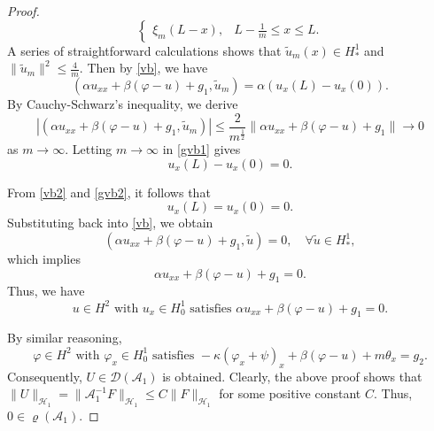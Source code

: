 \documentclass[10pt,a4paper]{amsart}
\begin{document}
\begin{proof}
\[\begin{cases}
		\xi_m(L-x), & L-\frac{1}{m}\le x\le L.
	\end{cases}
	\]
	A series of straightforward calculations shows that $\tilde{u}_m(x)\in H_*^1$ and $\|\tilde{u}_m\|^2 \le\frac{4}{m}$. Then by \eqref{vb}, we have
	\begin{equation}\label{gvb1}
		(\alpha u_{xx}+\beta(\varphi - u) + g_1,\tilde{u}_m)=\alpha \left(u_x(L)-u_x(0)\right).
	\end{equation}
	By Cauchy-Schwarz's inequality, we derive
	\[
	\left| (\alpha u_{xx}+\beta(\varphi - u) + g_1,\tilde{u}_m)\right|\le\frac{2}{m^{\frac{1}{2}}}\|\alpha u_{xx}+\beta(\varphi - u) + g_1\|\to0
	\]
	as $m\to\infty$.
    Letting $m\to\infty$ in \eqref{gvb1} gives
	\begin{equation}\label{gvb2}
		u_x(L)-u_x(0)=0.
	\end{equation}
	
	From \eqref{vb2} and \eqref{gvb2}, it follows that
	\[
	u_x(L)=u_x(0)=0.
	\]
	Substituting back into \eqref{vb}, we obtain
	\[
	(\alpha u_{xx}+\beta(\varphi - u) + g_1,\tilde{u})=0, \quad \forall \tilde{u}\in H_*^1,
	\]
	which implies
	\[
	\alpha u_{xx}+\beta(\varphi - u) + g_1=0.
	\]
	Thus, we have
	\begin{equation}\label{jl6}
		u\in H^2\text{ with } u_x\in H_0^1 \text{ satisfies } \alpha u_{xx}+\beta(\varphi - u) + g_1=0.
	\end{equation}
	
	By similar reasoning,
	\begin{equation}\label{jl7}
		\varphi\in H^2\text{ with } \varphi_x\in H_0^1\text{ satisfies } -\kappa(\varphi_x + \psi)_x + \beta(\varphi - u) + m\theta_x = g_2.
	\end{equation}
	Consequently, $U \in \mathcal{D}(\mathcal{A}_1)$ is obtained. Clearly, the above proof shows that $\|U\|_{\mathcal{H}_1}=\|\mathcal{A}_1^{-1}F\|_{\mathcal{H}_1} \leq C\|F\|_{\mathcal{H}_1}$ for some positive constant $C$. Thus, $0 \in \varrho(\mathcal{A}_1)$.
\end{proof}
\end{document}
